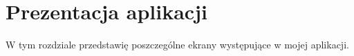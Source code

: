 \newpage
\section{Prezentacja aplikacji}
W tym rozdziale przedstawię poszczególne ekrany występujące w mojej aplikacji.
